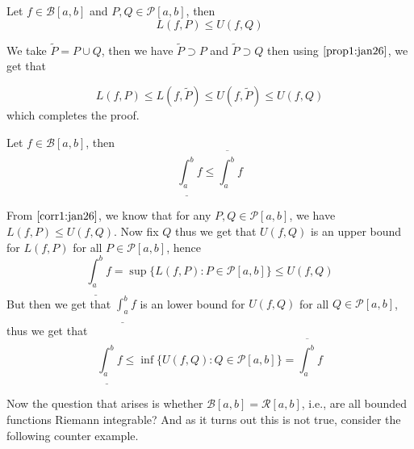 \begin{corr}\label{corr1:jan26}
    Let $f \in \mathcal{B}[a,b]$ and $P,Q \in \mathcal{P}[a,b]$, then \[ L(f,P) \leq U(f,Q) \] 
\end{corr}
\begin{prf}
    We take $\tilde{P} = P \cup Q$, then we have $ \tilde{P} \supset P $ and $ \tilde{P} \supset Q $ then using  $\ref{prop1:jan26}$, we get that 

    \[ L(f,P) \leq L(f,\tilde{P}) \leq U(f,\tilde{P}) \leq U(f,Q) \]
    which completes the proof.
\end{prf}

\begin{corr}\label{corr2:jan26}
    Let $f \in \mathcal{B}[a,b]$, then 
    \[ \underline{\int_a^b}f \leq \overline{\int_a^b} f \]
\end{corr}
\begin{prf}
    From  $\ref{corr1:jan26}$, we know that for any $P,Q \in \mathcal{P}[a,b]$, we have $L(f,P) \leq U(f,Q)$. Now fix $Q$ thus we get that $U(f,Q)$ is an upper bound for $L(f,P)$ for all $ P \in \mathcal{P}[a,b]$, hence \[ \underline{\int_a^b}f = \sup \{ L(f,P) : P \in \mathcal{P}[a,b] \} \leq U(f,Q) \]
    But then we get that $\displaystyle{\underline{\int_a^b}f}$ is an lower bound for $U(f,Q)$ for all $Q \in \mathcal{P}[a,b]$, thus we get that 
    \[ \underline{\int_a^b}f \leq \inf \{ U(f,Q) : Q \in \mathcal{P}[a,b] \} = \overline{\int_a^b}f \]
\end{prf}

Now the question that arises is whether $\mathcal{B}[a,b] = \mathcal{R}[a,b]$, i.e., are all bounded functions Riemann integrable? And as it turns out this is not true, consider the following counter example.

